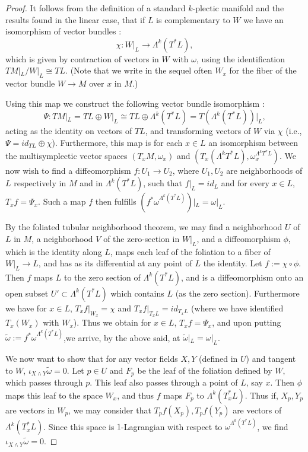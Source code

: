 \documentclass[a4paper,12pt,leqno]{article}
\begin{document}
\begin{proof}
It follows from the definition of a standard $k$-plectic manifold and the results found in the 
linear case, that if $L$ is complementary to $W$ we have an isomorphism of vector bundles :
\begin{equation*}
\chi : W|_{L} \rightarrow \Lambda^k(T^{*}L),
\end{equation*}
which is given by contraction of vectors in $W$ with $\omega$, using the identification $TM|_L/W|_L \cong TL$. (Note that we write in the
sequel often $W_x$ for the fiber of the vector bundle $W\to M$ over $x$ in $M$.) 

Using this map we construct the following vector bundle isomorphism :
\begin{equation*}
\Psi:TM|_L=TL\oplus W|_L \cong TL\oplus \Lambda^k(T^{*}L)=T(\Lambda^k(T^{*}L))|_L,
\end{equation*}
acting as the identity on vectors of $TL$, and transforming vectors of $W$ via $\chi$ (i.e., $\Psi=id_{TL}\oplus\chi$). Furthermore, this map is for each $x\in L$ an isomorphism between the multisymplectic vector spaces $(T_xM,\omega_x)$ and $(T_x(\Lambda^kT^*L),\omega^{\Lambda^kT^*L}_x)$. We now wish to find a diffeomorphism $f:U_1\rightarrow U_2$, where $U_1, U_2$ are neighborhoods of $L$ respectively in $M$ and in $\Lambda^k(T^{*}L)$, such that $f|_L=id_L$ and for every $x\in L$, $T_xf=\Psi_x$. 
Such a map $f$ then fulfills $(f^*\omega^{\Lambda^k(T^*L)})|_L=\omega|_L$. 

By the foliated tubular neighborhood theorem, we may find a neighborhood $U$ of $L$ in $M$, a neighborhood $V$ of the zero-section in $W|_L$, and a diffeomorphism $\phi$, which is the identity along $L$, maps each leaf of the foliation to a fiber of $W|_L\rightarrow L$, and has as its differential at any point of $L$ the identity. Let $f:=\chi \circ\phi$. Then $f$ maps $L$ to the zero section of $\Lambda^k(T^*L)$, and is a diffeomorphism onto an open subset $U'\subset \Lambda^k(T^*L)$ which contains $L$ (as the zero section). Furthermore we have for $x\in L$, $T_xf|_{W_x}=\chi$ and $T_xf|_{T_xL}=id_{T_xL}$ (where we have identified $T_x(W_x)$ with $W_x$). 
Thus we obtain for $x\in L$, $T_xf=\Psi_x$, and upon putting
$ \widetilde{\omega}:=f^*\omega^{\Lambda^k(T^*L)}$,we arrive, by the above said, at $\widetilde{\omega}|_L=\omega|_L$. 

We now want to show that for any vector fields $X,Y$ (defined in $U$) and tangent to $W$, $\iota_{X\wedge Y}\widetilde{\omega}=0$. Let $p\in U$ and $F_p$ be the leaf of the foliation defined by $W,$ which passes through $p$. This leaf also passes through a point of $L$, say $x$. Then $\phi$ maps this leaf to the space $W_x$, and thus $f$ maps $F_p$ to $\Lambda^k(T_x^*L)$. Thus if, $X_p,Y_p$ are vectors in $W_p$, we may consider that $T_pf(X_p),T_pf(Y_p)$ are vectors of $\Lambda^k(T_x^*L)$. Since this space is $1$-Lagrangian with respect to $\omega^{\Lambda^k(T^*L)}$, we find $\iota_{X\wedge Y}\widetilde{\omega}=0$.  



\end{proof}
\end{document}
